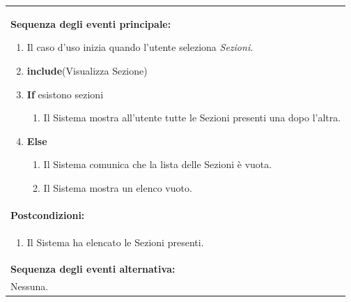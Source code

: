 \documentclass{article}
\begin{document}
\begin{table}[H]
\begin{tabular}{|p{\linewidth}|}
                        \vspace{0pt} \\
                        \hline
                        \textbf{Sequenza degli eventi principale:}
                        \begin{enumerate}
                            \item Il caso d'uso inizia quando l'utente seleziona \textit{Sezioni}.
                            \item \textbf{include}(Visualizza Sezione)
                            \item \textbf{If} esistono sezioni
                            \begin{enumerate}
                                \item Il Sistema mostra all'utente tutte le Sezioni presenti una dopo l'altra.
                            \end{enumerate}
                            \item \textbf{Else}
                            \begin{enumerate}
                                \item Il Sistema comunica che la lista delle Sezioni è vuota.
                                \item Il Sistema mostra un elenco vuoto.
                            \end{enumerate}				
                        \end{enumerate} \\
                        \hline
                        \cellcolor{gray!20}
                        \textbf{Postcondizioni:} \\
                        \cellcolor{gray!20}
                        \begin{minipage}{\linewidth}
                            \begin{enumerate}
                                \item Il Sistema ha elencato le Sezioni presenti.
                            \end{enumerate}
                        \end{minipage} \\
                        \hline
                        \textbf{Sequenza degli eventi alternativa:} \\
                        Nessuna. \\
                        \hline
                    \end{tabular}
                \end{table}
                
\end{document}
